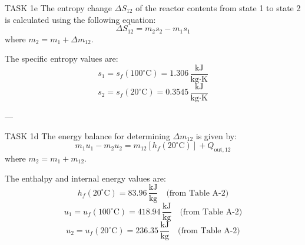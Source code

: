 TASK 1e  
The entropy change \( \Delta S_{12} \) of the reactor contents from state 1 to state 2 is calculated using the following equation:  
\[
\Delta S_{12} = m_2 s_2 - m_1 s_1
\]  
where \( m_2 = m_1 + \Delta m_{12} \).  

The specific entropy values are:  
\[
s_1 = s_f(100^\circ\text{C}) = 1.306 \, \frac{\text{kJ}}{\text{kg·K}}
\]  
\[
s_2 = s_f(20^\circ\text{C}) = 0.3545 \, \frac{\text{kJ}}{\text{kg·K}}
\]  

---

TASK 1d  
The energy balance for determining \( \Delta m_{12} \) is given by:  
\[
m_1 u_1 - m_2 u_2 = m_{12} \left[ h_f(20^\circ\text{C}) \right] + Q_{\text{out},12}
\]  
where \( m_2 = m_1 + m_{12} \).  

The enthalpy and internal energy values are:  
\[
h_f(20^\circ\text{C}) = 83.96 \, \frac{\text{kJ}}{\text{kg}} \quad \text{(from Table A-2)}
\]  
\[
u_1 = u_f(100^\circ\text{C}) = 418.94 \, \frac{\text{kJ}}{\text{kg}} \quad \text{(from Table A-2)}
\]  
\[
u_2 = u_f(20^\circ\text{C}) = 236.35 \, \frac{\text{kJ}}{\text{kg}} \quad \text{(from Table A-2)}
\]